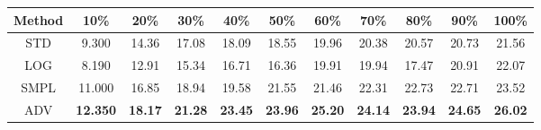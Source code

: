 \documentclass{standalone}
\begin{document}
\begin{tabular}{c|cccccccccc}
      \toprule
      Method & 10\% & 20\% & 30\% & 40\% & 50\% & 60\% & 70\% & 80\% & 90\% & 100\% \\
      \midrule
STD & 9.300 & 14.36 & 17.08 & 18.09 & 18.55 & 19.96 & 20.38 & 20.57 & 20.73 & 21.56\\
LOG & 8.190 & 12.91 & 15.34 & 16.71 & 16.36 & 19.91 & 19.94 & 17.47 & 20.91 & 22.07\\
SMPL & 11.000 & 16.85 & 18.94 & 19.58 & 21.55 & 21.46 & 22.31 & 22.73 & 22.71 & 23.52\\
ADV & \textbf{12.350} & \textbf{18.17} & \textbf{21.28} & \textbf{23.45} & \textbf{23.96} & \textbf{25.20} & \textbf{24.14} & \textbf{23.94} & \textbf{24.65} & \textbf{26.02}\\
  \bottomrule
\end{tabular}
\end{document}
